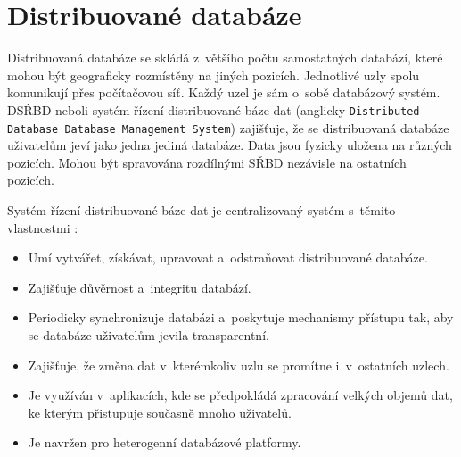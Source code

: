 \section{Distribuované databáze}
Distribuovaná databáze se skládá z~většího počtu samostatných databází, které mohou být geograficky rozmístěny na jiných pozicích. Jednotlivé uzly spolu komunikují přes počítačovou síť. Každý uzel je sám o~sobě databázový systém. DSŘBD neboli systém řízení distribuované báze dat (anglicky \texttt{Distributed Database Database Management System}) zajišťuje, že se distribuovaná databáze uživatelům jeví jako jedna jediná databáze. Data jsou fyzicky uložena na různých pozicích. Mohou být spravována rozdílnými SŘBD nezávisle na ostatních pozicích.

\vspace{0.5cm}

\noindent Systém řízení distribuované báze dat je centralizovaný systém s~těmito vlastnostmi 
\cite{distributedDBMS}:

\begin{itemize}
\item Umí vytvářet, získávat, upravovat a~odstraňovat distribuované databáze.

\item Zajišťuje důvěrnost a~integritu databází.

\item Periodicky synchronizuje databázi a~poskytuje mechanismy přístupu tak, aby se databáze uživatelům jevila transparentní.

\item Zajišťuje, že změna dat v~kterémkoliv uzlu se promítne i~v~ostatních uzlech.

\item Je využíván v~aplikacích, kde se předpokládá zpracování velkých objemů dat, ke kterým přistupuje současně mnoho uživatelů.

\item Je navržen pro heterogenní databázové platformy.
\end{itemize}

